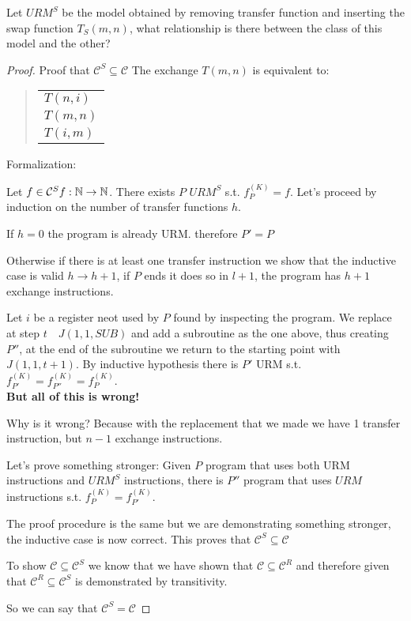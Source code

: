 \begin{exercise}
Let $URM^S $ be the model obtained by removing transfer function and inserting the swap function $ T_S(m,n) $, what relationship is there between the class of this model and the other?

\begin{proof}
  Proof that $ \mathcal{C}^S \subseteq \mathcal{C} $ The exchange $T (m, n)$ is equivalent to:
  \begin{quote}
    \begin{tabular}{l}
    $T(n,i)$ \\
    $T(m,n)$ \\
    $T(i,m)$
    \end{tabular}
    \end{quote}

Formalization:

Let $ f \in \mathcal{C}^S f:\mathbb{N}\rightarrow \mathbb{N} $. There exists $P$  $URM^S $ s.t. $ f_P^{(K)} = f $. Let's proceed by induction on the number of transfer functions $h$.

If $h = 0$ the program is already URM. therefore $ P' = P $

Otherwise if there is at least one transfer instruction we show that the inductive case is valid $ h \rightarrow h+1 $, if $P$ ends it does so in $l + 1$, the program has $h + 1$ exchange instructions.

Let $i$ be a register neot used by $P$ found by inspecting the program. We replace at step $t \quad J (1,1, SUB)$ and add a subroutine as the one above, thus creating $ P'' $, at the end of the subroutine we return to the starting point with $J (1,1, t + 1)$. By inductive hypothesis there is $ P' $ URM s.t. $ f_{P'}^{(K)} = f_{P''}^{(K)} = f_{P}^{(K)}$. \\
\textbf{But all of this is wrong!}

Why is it wrong? Because with the replacement that we made we have 1 transfer instruction, but $n-1$ exchange instructions.

Let's prove something stronger: Given $P$ program that uses both URM instructions and  $URM^S $ instructions, there is $ P'' $ program that uses $URM$ instructions s.t. $ f_{P}^{(K)} = f_{P'}^{(K)} $.

The proof procedure is the same but we are demonstrating something stronger, the inductive case is now correct. This proves that $ \mathcal{C}^S \subseteq \mathcal{C} $

To show $  \mathcal{C} \subseteq \mathcal{C}^S $ we know that we have shown that $ \mathcal{C} \subseteq \mathcal{C}^R $ and therefore given that $ \mathcal{C}^R \subseteq \mathcal{C}^S $ is demonstrated by transitivity.

So we can say that $ \mathcal{C}^S = \mathcal{C} $
\end{proof}
\end{exercise}

